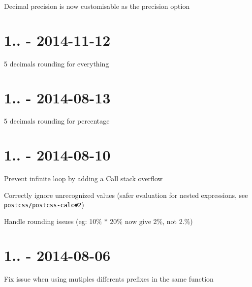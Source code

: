 \begin{DoxyItemize}
\item Decimal precision is now customisable as the {\ttfamily precision} option
\end{DoxyItemize}

\section*{1.. -\/ 2014-\/11-\/12}


\begin{DoxyItemize}
\item 5 decimals rounding for everything
\end{DoxyItemize}

\section*{1.. -\/ 2014-\/08-\/13}


\begin{DoxyItemize}
\item 5 decimals rounding for percentage
\end{DoxyItemize}

\section*{1.. -\/ 2014-\/08-\/10}


\begin{DoxyItemize}
\item Prevent infinite loop by adding a {\ttfamily Call stack overflow}
\item Correctly ignore unrecognized values (safer evaluation for nested expressions, see \href{https://github.com/postcss/postcss-calc/issues/2}{\tt postcss/postcss-\/calc\#2})
\item Handle rounding issues (eg\+: 10\% $\ast$ 20\% now give 2\%, not 2.\%)
\end{DoxyItemize}

\section*{1.. -\/ 2014-\/08-\/06}


\begin{DoxyItemize}
\item Fix issue when using mutiples differents prefixes in the same function
\end{DoxyItemize}

